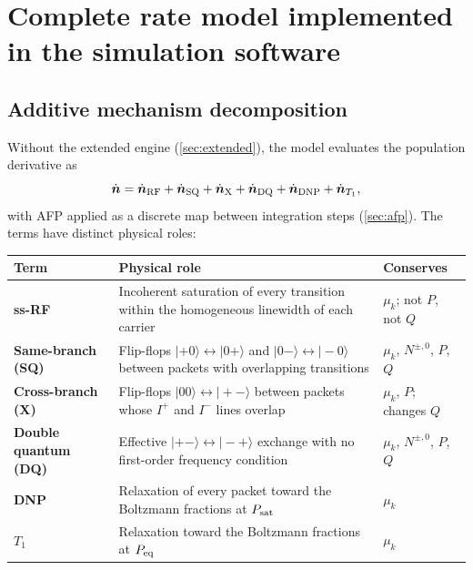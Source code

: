\documentclass[11pt]{article}
\newcommand{\Iplus}{I^{+}}
\newcommand{\Iminus}{I^{-}}
\begin{document}
\section{Complete rate model implemented in the simulation software}
\label{sec:ratemodel}

\subsection{Additive mechanism decomposition}

Without the extended engine (\cref{sec:extended}), the model evaluates the population derivative as
\begin{equation}
  \dot{\bm n}
  =\dot{\bm n}_{\rm RF}
  +\dot{\bm n}_{\rm SQ}
  +\dot{\bm n}_{\rm X}
  +\dot{\bm n}_{\rm DQ}
  +\dot{\bm n}_{\rm DNP}
  +\dot{\bm n}_{T_1},
  \label{eq:totalrate}
\end{equation}
with AFP applied as a discrete map between integration steps (\cref{sec:afp}). The terms have
distinct physical roles:

\begin{center}
\begin{tabularx}{0.96\textwidth}{>{\bfseries}L{0.20\textwidth} X L{0.24\textwidth}}
\toprule
Term & Physical role & Conserves\\
\midrule
ss-RF & Incoherent saturation of every transition within the homogeneous linewidth of each carrier & \(\mu_k\); not \(P\), not \(Q\)\\
Same-branch (SQ) & Flip-flops \(|{+}0\rangle\leftrightarrow|0{+}\rangle\) and \(|0{-}\rangle\leftrightarrow|{-}0\rangle\) between packets with overlapping transitions & \(\mu_k\), \(N^{\pm,0}\), \(P\), \(Q\)\\
Cross-branch (X) & Flip-flops \(|00\rangle\leftrightarrow|{+}{-}\rangle\) between packets whose \(\Iplus\) and \(\Iminus\) lines overlap & \(\mu_k\), \(P\); changes \(Q\)\\
Double quantum (DQ) & Effective \(|{+}{-}\rangle\leftrightarrow|{-}{+}\rangle\) exchange with no first-order frequency condition & \(\mu_k\), \(N^{\pm,0}\), \(P\), \(Q\)\\
DNP & Relaxation of every packet toward the Boltzmann fractions at \(P_{\rm sat}\) & \(\mu_k\)\\
\(T_1\) & Relaxation toward the Boltzmann fractions at \(P_{\rm eq}\) & \(\mu_k\)\\
\bottomrule
\end{tabularx}
\end{center}
\end{document}
